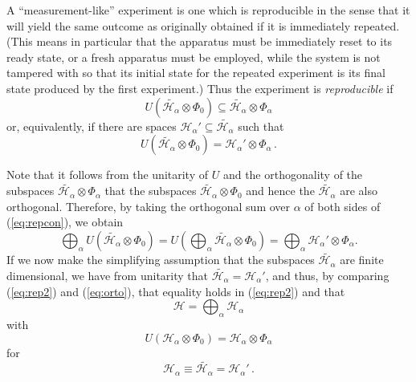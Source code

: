 \documentclass[12pt]{article}
\newcommand{\eq}[1]{(\ref{#1})}
\renewcommand{\a}{\alpha}
\newcommand{\ot}{\otimes}
\newcommand{\biga}{\bigoplus_{\a}}
\newcommand{\Phia}{\Phi_{\a}}
\newcommand{\Ha}{{\H}_{\a}}
\renewcommand{\H}{\mbox{$\mathcal{H}$}}
\begin{document}
A ``measurement-like'' experiment is one which is reproducible in the
sense that it will yield the same outcome as originally obtained if it
is immediately repeated.  (This means in particular that the apparatus
must be immediately reset to its ready state, or a fresh apparatus
must be employed, while the system is not tampered with so that its
initial state for the repeated experiment is its final state produced
by the first experiment.)  Thus the experiment is \emph{reproducible}
if
\begin{equation}
U(\widetilde{\mathcal{H}_{\a}}\ot\Phi_0) \subseteq
\widetilde{\mathcal{H}_{\a}}\ot\Phia \label{eq:repconold}
\end{equation}
or, equivalently, if there are spaces ${\Ha}'\subseteq
\widetilde{\mathcal{H}_{\a}}$ such that
\begin{equation}
U(\widetilde{\mathcal{H}_{\a}}\ot\Phi_0) = {\Ha}'\ot\Phia
\label{eq:repcon}\,.
\end{equation}

Note that it follows {}from the unitarity of $U$ and the orthogonality
of the subspaces $\widetilde{\Ha}\ot\Phia$ that the subspaces
$\widetilde{\mathcal{H}_{\a}}\ot\Phi_0$ and hence the
$\widetilde{\mathcal{H}_{\a}}$ are also orthogonal.  Therefore, by
taking the orthogonal sum over $\a$ of both sides of
(\ref{eq:repcon}), we obtain
\begin{equation}
\biga U(\widetilde{\mathcal{H}_{\a}}\ot\Phi_0)=  U \left( \biga
\widetilde{\mathcal{H}_{\a}}\ot\Phi_0\right) = \biga {\Ha}'\ot\Phia.
\label{eq:orto}
\end{equation}
If we now make the simplifying assumption that the subspaces
$\widetilde{\mathcal{H}_{\a}}$ are finite dimensional, we have {}from
unitarity that $ \widetilde{\mathcal{H}_{\a}}= {\Ha}'$, and thus, by
comparing \eq{eq:rep2} and (\ref{eq:orto}), that equality holds in
\eq{eq:rep2} and that
\begin{equation}
{\H}=\biga {\Ha}
\label{eq:sum}
\end{equation}
%
with
%
\begin{equation}
U({\H_\a} \ot \Phi_0 )=  {\Ha} \ot \Phia
\label{eq:rep4}
\end{equation}
%
for $$\Ha \equiv \widetilde{\mathcal{H}_{\a}}={\Ha}' \, .$$
\end{document}
